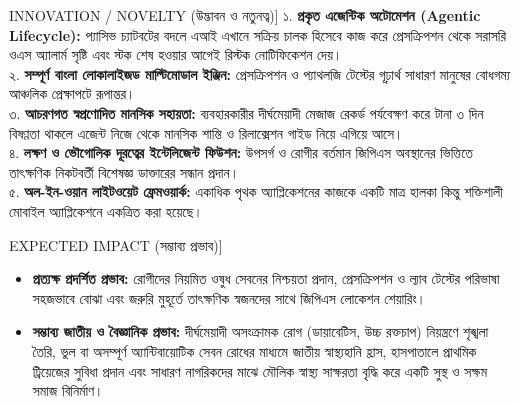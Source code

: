 \documentclass[12pt,a4paper,oneside]{report}
\begin{document}
\begin{highlightbox}[title=[FIELD 5] INNOVATION / NOVELTY (উদ্ভাবন ও নতুনত্ব)]
১. \textbf{প্রকৃত এজেন্টিক অটোমেশন (Agentic Lifecycle):} প্যাসিভ চ্যাটবটের বদলে এআই এখানে সক্রিয় চালক হিসেবে কাজ করে প্রেসক্রিপশন থেকে সরাসরি ওএস অ্যালার্ম সৃষ্টি এবং স্টক শেষ হওয়ার আগেই রিস্টক নোটিফিকেশন দেয়।\\
২. \textbf{সম্পূর্ণ বাংলা লোকালাইজড মাল্টিমোডাল ইঞ্জিন:} প্রেসক্রিপশন ও প্যাথলজি টেস্টের গূঢ়ার্থ সাধারণ মানুষের বোধগম্য আঞ্চলিক প্রেক্ষাপটে রূপান্তর।\\
৩. \textbf{আচরণগত স্বপ্রণোদিত মানসিক সহায়তা:} ব্যবহারকারীর দীর্ঘমেয়াদী মেজাজ রেকর্ড পর্যবেক্ষণ করে টানা ৩ দিন বিষণ্ণতা থাকলে এজেন্ট নিজে থেকে মানসিক শান্তি ও রিলাক্সেশন গাইড নিয়ে এগিয়ে আসে।\\
৪. \textbf{লক্ষণ ও ভৌগোলিক দূরত্বের ইন্টেলিজেন্ট ফিউশন:} উপসর্গ ও রোগীর বর্তমান জিপিএস অবস্থানের ভিত্তিতে তাৎক্ষণিক নিকটবর্তী বিশেষজ্ঞ ডাক্তারের সন্ধান প্রদান।\\
৫. \textbf{অল-ইন-ওয়ান লাইটওয়েট ফ্রেমওয়ার্ক:} একাধিক পৃথক অ্যাপ্লিকেশনের কাজকে একটি মাত্র হালকা কিন্তু শক্তিশালী মোবাইল অ্যাপ্লিকেশনে একত্রিত করা হয়েছে।
\end{highlightbox}

\begin{highlightbox}[title=[FIELD 6] EXPECTED IMPACT (সম্ভাব্য প্রভাব)]
\begin{itemize}
    \item \textbf{প্রত্যক্ষ প্রদর্শিত প্রভাব:} রোগীদের নিয়মিত ওষুধ সেবনের নিশ্চয়তা প্রদান, প্রেসক্রিপশন ও ল্যাব টেস্টের পরিভাষা সহজভাবে বোঝা এবং জরুরি মুহূর্তে তাৎক্ষণিক স্বজনদের সাথে জিপিএস লোকেশন শেয়ারিং।
    \item \textbf{সম্ভাব্য জাতীয় ও বৈজ্ঞানিক প্রভাব:} দীর্ঘমেয়াদী অসংক্রামক রোগ (ডায়াবেটিস, উচ্চ রক্তচাপ) নিয়ন্ত্রণে শৃঙ্খলা তৈরি, ভুল বা অসম্পূর্ণ অ্যান্টিবায়োটিক সেবন রোধের মাধ্যমে জাতীয় স্বাস্থ্যহানি হ্রাস, হাসপাতালে প্রাথমিক ট্রিয়েজের সুবিধা প্রদান এবং সাধারণ নাগরিকদের মাঝে মৌলিক স্বাস্থ্য সাক্ষরতা বৃদ্ধি করে একটি সুস্থ ও সক্ষম সমাজ বিনির্মাণ।
\end{itemize}
\end{highlightbox}
\end{document}

